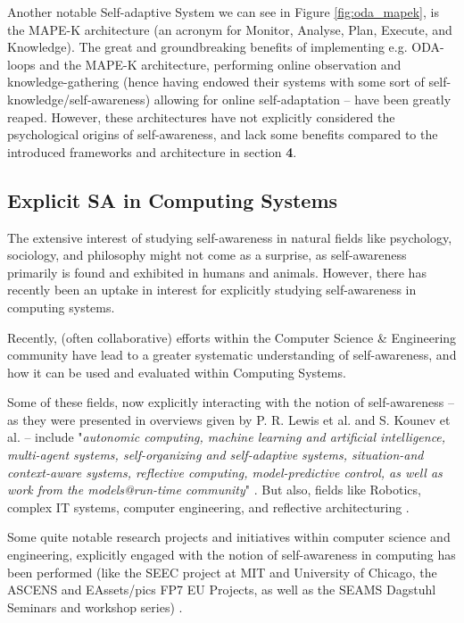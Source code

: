 	Another notable Self-adaptive System we can see in Figure \ref{fig:oda_mapek}, is the MAPE-K architecture (an acronym for Monitor, Analyse, Plan, Execute, and Knowledge). The great and groundbreaking benefits of implementing e.g. ODA-loops and the MAPE-K architecture, performing online observation and knowledge-gathering (hence having endowed their systems with some sort of self-knowledge/self-awareness) allowing for online self-adaptation -- have been greatly reaped. However, these architectures have not explicitly considered the psychological origins of self-awareness, and lack some benefits compared to the introduced frameworks and architecture in section \textbf{4}.


	\subsection{Explicit SA in Computing Systems}
	The extensive interest of studying self-awareness in natural fields like psychology, sociology, and philosophy might not come as a surprise, as self-awareness primarily is found and exhibited in humans and animals. However, there has recently been an uptake in interest for explicitly studying self-awareness in computing systems.

	Recently, (often collaborative) efforts within the Computer Science \& Engineering community \cite{sacs16_ch2, sacs17_ch1, sacs17_ch3} have lead to a greater systematic understanding of self-awareness, and how it can be used and evaluated within Computing Systems.

	Some of these fields, now explicitly interacting with the notion of self-awareness -- as they were presented in overviews given by P. R. Lewis et al. \cite{sacs17_ch3} and S. Kounev et al. \cite{sacs17_ch1} -- include "\textit{autonomic computing, machine learning and artificial intelligence, multi-agent systems, self-organizing and self-adaptive systems, situation-and context-aware systems, reflective computing, model-predictive control, as well as work from the models@run-time community}" \cite{sacs17_ch1}. But also, fields like Robotics, complex IT systems, computer engineering, and reflective architecturing \cite{sacs17_ch3}.

	Some quite notable research projects and initiatives within computer science and engineering, explicitly engaged with the notion of self-awareness in computing has been performed (like the SEEC project at MIT and University of Chicago, the ASCENS and EAssets/pics FP7 EU Projects, as well as the SEAMS Dagstuhl Seminars and workshop series) \cite{sacs17_ch1}.


